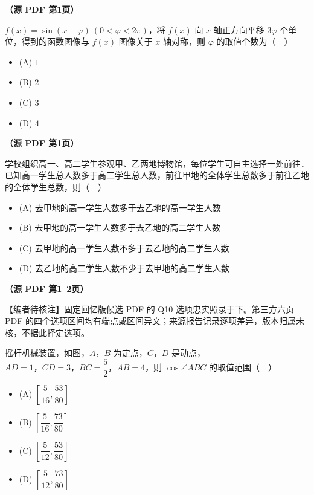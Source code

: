\begin{question}
\textbf{（源 PDF 第1页）} 

\(f(x)=\sin(x+\varphi)\ (0<\varphi<2\pi)\)，将 \(f(x)\) 向 \(x\) 轴正方向平移 \(3\varphi\) 个单位，得到的函数图像与 \(f(x)\) 图像关于 \(x\) 轴对称，则 \(\varphi\) 的取值个数为（　）

\begin{itemize}
\item (A) \(1\)
\item (B) \(2\)
\item (C) \(3\)
\item (D) \(4\)
\end{itemize}

\end{question}
\begingroup
\renewenvironment{question}{\Needspace{0.3\textheight}}{}
\begin{question}
\textbf{（源 PDF 第1页）} 

学校组织高一、高二学生参观甲、乙两地博物馆，每位学生可自主选择一处前往．已知高一学生总人数多于高二学生总人数，前往甲地的全体学生总数多于前往乙地的全体学生总数，则（　）

\begin{itemize}
\item (A) 去甲地的高一学生人数多于去乙地的高一学生人数
\item (B) 去甲地的高一学生人数多于去乙地的高二学生人数
\item (C) 去甲地的高一学生人数不多于去乙地的高二学生人数
\item (D) 去乙地的高二学生人数不少于去甲地的高二学生人数
\end{itemize}

\Needspace{0.4\textheight}
\end{question}
\endgroup
\begin{question}
\textbf{（源 PDF 第1–2页）} 

\begin{gktip}
【编者待核注】固定回忆版候选 PDF 的 Q10 选项忠实照录于下。第三方六页 PDF 的四个选项区间均有端点或区间异文；来源报告记录逐项差异，版本归属未核，不据此择定选项。
\end{gktip}

摇杆机械装置，如图，\(A\text{，}B\) 为定点，\(C\text{，}D\) 是动点，\(AD=1\text{，}CD=3\text{，}BC=\dfrac{5}{2}\text{，}AB=4\)，则 \(\cos\angle ABC\) 的取值范围（　）
\nopagebreak[4]
\begin{center}\end{center}
\nopagebreak[4]
\begin{itemize}
\item (A) \(\left[\dfrac{5}{16},\dfrac{53}{80}\right]\)
\item (B) \(\left[\dfrac{5}{16},\dfrac{73}{80}\right]\)
\item (C) \(\left[\dfrac{5}{12},\dfrac{53}{80}\right]\)
\item (D) \(\left[\dfrac{5}{12},\dfrac{73}{80}\right]\)
\end{itemize}

\end{question}

